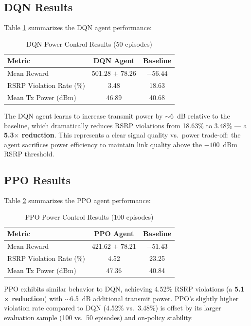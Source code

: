\documentclass[conference]{IEEEtran}
\begin{document}
\subsection{DQN Results}

Table \ref{tab:dqn_results} summarizes the DQN agent performance:

\begin{table}[t]
\centering
\caption{DQN Power Control Results (50 episodes)}
\label{tab:dqn_results}
\scriptsize
\begin{tabular}{@{}lcc@{}}
\toprule
\textbf{Metric} & \textbf{DQN Agent} & \textbf{Baseline} \\
\midrule
Mean Reward & 501.28 $\pm$ 78.26 & $-56.44$ \\
RSRP Violation Rate (\%) & 3.48 & 18.63 \\
Mean Tx Power (dBm) & 46.89 & 40.68 \\
\bottomrule
\end{tabular}
\end{table}

The DQN agent learns to increase transmit power by $\sim$6~dB relative to the baseline, which dramatically reduces RSRP violations from 18.63\% to 3.48\% --- a \textbf{5.3$\times$ reduction}. This represents a clear signal quality vs.\ power trade-off: the agent sacrifices power efficiency to maintain link quality above the $-100$~dBm RSRP threshold.

\subsection{PPO Results}

Table \ref{tab:ppo_results} summarizes the PPO agent performance:

\begin{table}[t]
\centering
\caption{PPO Power Control Results (100 episodes)}
\label{tab:ppo_results}
\scriptsize
\begin{tabular}{@{}lcc@{}}
\toprule
\textbf{Metric} & \textbf{PPO Agent} & \textbf{Baseline} \\
\midrule
Mean Reward & 421.62 $\pm$ 78.21 & $-51.43$ \\
RSRP Violation Rate (\%) & 4.52 & 23.25 \\
Mean Tx Power (dBm) & 47.36 & 40.84 \\
\bottomrule
\end{tabular}
\end{table}

PPO exhibits similar behavior to DQN, achieving 4.52\% RSRP violations (a \textbf{5.1$\times$ reduction}) with $\sim$6.5~dB additional transmit power. PPO's slightly higher violation rate compared to DQN (4.52\% vs.\ 3.48\%) is offset by its larger evaluation sample (100 vs.\ 50 episodes) and on-policy stability.
\end{document}
